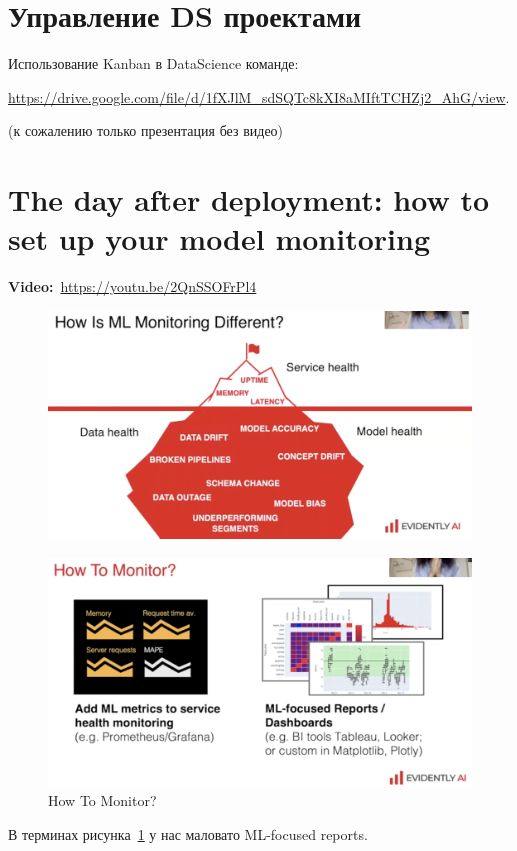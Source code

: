 \section*{Управление DS проектами}

Использование Kanban в DataScience команде:

\url{https://drive.google.com/file/d/1fXJlM_sdSQTc8kXI8aMIftTCHZj2_AhG/view}.

(к сожалению только презентация без видео)

\section{The day after deployment: how to set up your model monitoring}

\textbf{Video:}~\url{https://youtu.be/2QnSSOFrPl4} \\ 

\begin{figure}[ht]
    \centering
    \includegraphics[width=0.8\linewidth]{images/monitoring.png}
\end{figure}

\begin{figure}[ht]
    \centering
    \includegraphics[width=0.8\linewidth]{images/monitoring_2.png}
    \caption{How To Monitor?}
    \label{fig:monitoring}
\end{figure}

\begin{remark}
    В терминах рисунка~\ref{fig:monitoring} у нас маловато ML-focused reports.
\end{remark}

